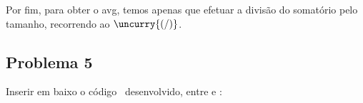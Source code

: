 \documentclass[a4paper]{article}
\begin{document}
Por fim, para obter o avg, temos apenas que efetuar a divisão do somatório pelo tamanho, recorrendo ao \ensuremath{\uncurry{(\mathbin{/})}}.







\subsection*{Problema 5}
Inserir em baixo o código \Fsharp\ desenvolvido, entre  e :

\begin{tabbing}\ttfamily

\end{tabbing}



\printindex





\end{document}
